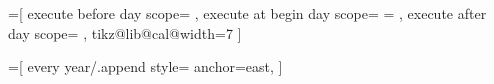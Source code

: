 \documentclass[french]{article}
\begin{document}
    \makeatletter


    =[
        execute before day scope={%
        },
        execute at begin day scope={%
            \pgfmathsetlength\pgf@y{\tikz@lib@cal@yshift}%
            \pgf@y=\pgfcalendarcurrentweekday\pgf@y
            \pgftransformyshift{-\pgf@y}
        },
        execute after day scope={
        },
        tikz@lib@cal@width=7
    ]

    =[
        every year/.append style={
            anchor=east,
        }
    ]
\end{document}
